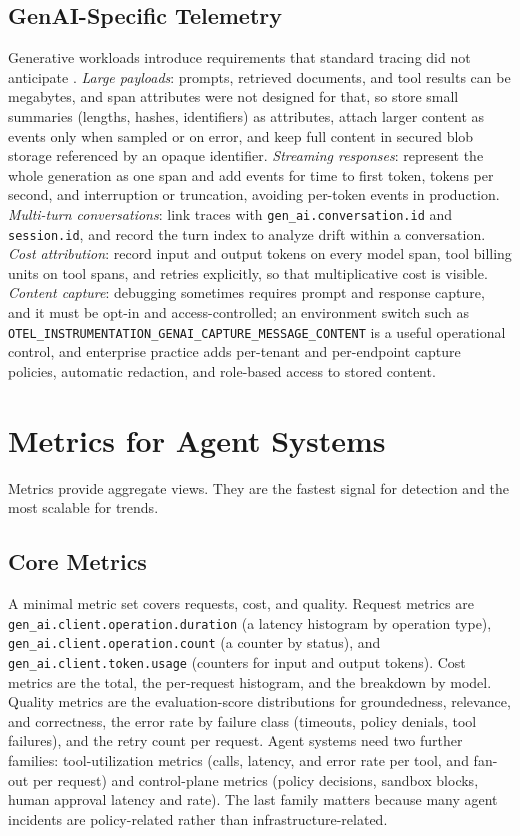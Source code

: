 \documentclass[11pt]{book}
\begin{document}
\subsection{GenAI-Specific Telemetry}

Generative workloads introduce requirements that standard tracing did not anticipate \cite{otelgenai2025}. \textit{Large payloads}: prompts, retrieved documents, and tool results can be megabytes, and span attributes were not designed for that, so store small summaries (lengths, hashes, identifiers) as attributes, attach larger content as events only when sampled or on error, and keep full content in secured blob storage referenced by an opaque identifier. \textit{Streaming responses}: represent the whole generation as one span and add events for time to first token, tokens per second, and interruption or truncation, avoiding per-token events in production. \textit{Multi-turn conversations}: link traces with \texttt{gen\_ai.conversation.id} and \texttt{session.id}, and record the turn index to analyze drift within a conversation. \textit{Cost attribution}: record input and output tokens on every model span, tool billing units on tool spans, and retries explicitly, so that multiplicative cost is visible. \textit{Content capture}: debugging sometimes requires prompt and response capture, and it must be opt-in and access-controlled; an environment switch such as \texttt{OTEL\_INSTRUMENTATION\_GENAI\_CAPTURE\_MESSAGE\_CONTENT} is a useful operational control, and enterprise practice adds per-tenant and per-endpoint capture policies, automatic redaction, and role-based access to stored content.

\section{Metrics for Agent Systems}

Metrics provide aggregate views. They are the fastest signal for detection and the most scalable for trends.

\subsection{Core Metrics}

A minimal metric set covers requests, cost, and quality. Request metrics are \texttt{gen\_ai.client.operation.duration} (a latency histogram by operation type), \texttt{gen\_ai.client.operation.count} (a counter by status), and \texttt{gen\_ai.client.token.usage} (counters for input and output tokens). Cost metrics are the total, the per-request histogram, and the breakdown by model. Quality metrics are the evaluation-score distributions for groundedness, relevance, and correctness, the error rate by failure class (timeouts, policy denials, tool failures), and the retry count per request. Agent systems need two further families: tool-utilization metrics (calls, latency, and error rate per tool, and fan-out per request) and control-plane metrics (policy decisions, sandbox blocks, human approval latency and rate). The last family matters because many agent incidents are policy-related rather than infrastructure-related.
\end{document}
